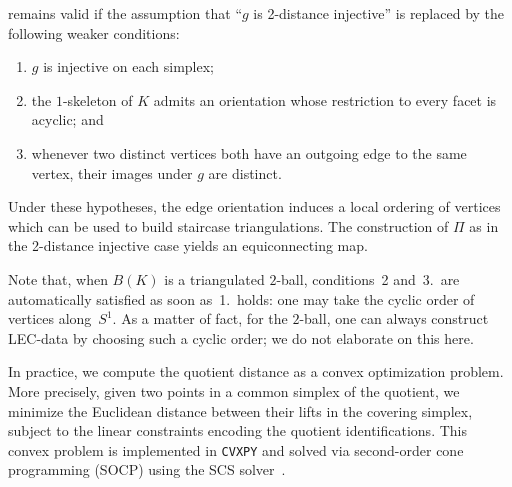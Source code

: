 \documentclass[a4paper,english,cleveref,autoref,thm-restate,nolineno]{socg-lipics-v2021}
\begin{document}
\begin{note}
	 remains valid if the assumption that ``$g$ is 2-distance injective'' is replaced by the following weaker conditions:
	\begin{enumerate}
		\item $g$ is injective on each simplex;
		\item the $1$-skeleton of $K$ admits an orientation whose restriction to every facet is acyclic; and
		\item whenever two distinct vertices both have an outgoing edge to the same vertex, their images under $g$ are distinct.
	\end{enumerate}
	Under these hypotheses, the edge orientation induces a local ordering of vertices which can be used to build staircase triangulations.
	The construction of $\Pi$ as in the 2-distance injective case yields an equiconnecting map.
	
	Note that, when $B(K)$ is a triangulated $2$-ball, conditions~2 and~3.\ are automatically satisfied as soon as~1.\ holds: one may take the cyclic order of vertices along~$S^1$.
	As a matter of fact, for the $2$-ball, one can always construct LEC-data by choosing such a cyclic order; we do not elaborate on this here.
\end{note}

\begin{note}
	\label{note:cvxpy}
	In practice, we compute the quotient distance as a convex optimization problem.
	More precisely, given two points in a common simplex of the quotient, we minimize the Euclidean distance between their lifts in the covering simplex, subject to the linear constraints encoding the quotient identifications.
	This convex problem is implemented in \texttt{CVXPY} and solved via second-order cone programming (SOCP) using the SCS solver~\cite{diamond2016cvxpy,agrawal2018rewriting}.
\end{note}
\end{document}
